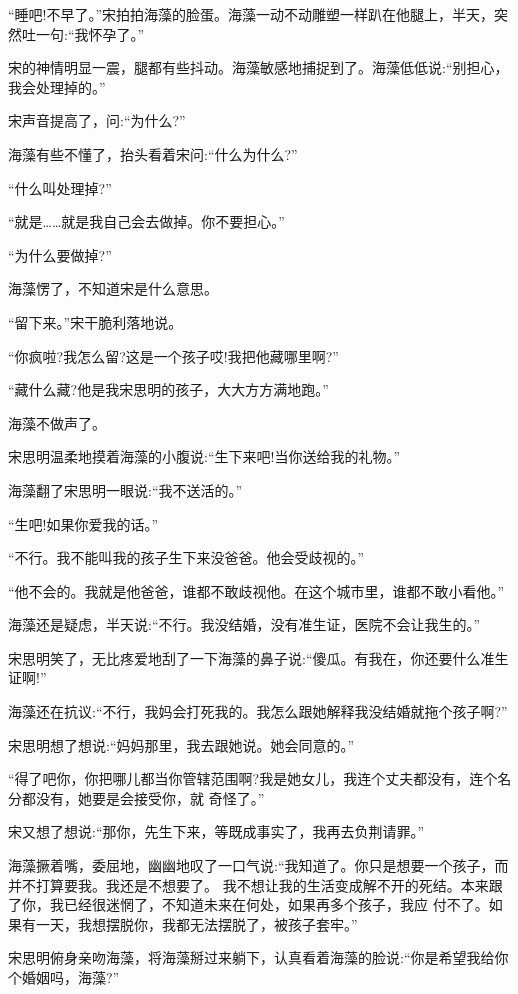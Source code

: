 \documentclass[11pt,a4paper,onecolumn]{article}
\begin{document}
``睡吧!不早了。''宋拍拍海藻的脸蛋。海藻一动不动雕塑一样趴在他腿上，半天，突然吐一句:``我怀孕了。''

宋的神情明显一震，腿都有些抖动。海藻敏感地捕捉到了。海藻低低说:``别担心，我会处理掉的。''

宋声音提高了，问:``为什么?''

海藻有些不懂了，抬头看着宋问:``什么为什么?''

``什么叫处理掉?''

``就是……就是我自己会去做掉。你不要担心。''

``为什么要做掉?''

海藻愣了，不知道宋是什么意思。

``留下来。''宋干脆利落地说。

``你疯啦?我怎么留?这是一个孩子哎!我把他藏哪里啊?''

``藏什么藏?他是我宋思明的孩子，大大方方满地跑。''

海藻不做声了。

宋思明温柔地摸着海藻的小腹说:``生下来吧!当你送给我的礼物。''

海藻翻了宋思明一眼说:``我不送活的。''

``生吧!如果你爱我的话。''

``不行。我不能叫我的孩子生下来没爸爸。他会受歧视的。''

``他不会的。我就是他爸爸，谁都不敢歧视他。在这个城市里，谁都不敢小看他。''

海藻还是疑虑，半天说:``不行。我没结婚，没有准生证，医院不会让我生的。''

宋思明笑了，无比疼爱地刮了一下海藻的鼻子说:``傻瓜。有我在，你还要什么准生证啊!''

海藻还在抗议:``不行，我妈会打死我的。我怎么跟她解释我没结婚就拖个孩子啊?''

宋思明想了想说:``妈妈那里，我去跟她说。她会同意的。''

``得了吧你，你把哪儿都当你管辖范围啊?我是她女儿，我连个丈夫都没有，连个名分都没有，她要是会接受你，就
奇怪了。''

宋又想了想说:``那你，先生下来，等既成事实了，我再去负荆请罪。''

海藻撅着嘴，委屈地，幽幽地叹了一口气说:``我知道了。你只是想要一个孩子，而并不打算要我。我还是不想要了。
我不想让我的生活变成解不开的死结。本来跟了你，我已经很迷惘了，不知道未来在何处，如果再多个孩子，我应
付不了。如果有一天，我想摆脱你，我都无法摆脱了，被孩子套牢。''

宋思明俯身亲吻海藻，将海藻掰过来躺下，认真看着海藻的脸说:``你是希望我给你个婚姻吗，海藻?''
\end{document}
